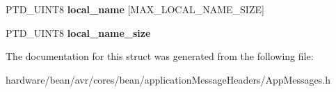 \begin{DoxyCompactItemize}
\item 
\hypertarget{struct_b_t___r_a_d_i_o_c_o_n_f_i_g___t_a07432b46b98c8f527882134e6a9c6299}{}P\+T\+D\+\_\+\+U\+I\+N\+T8 {\bfseries local\+\_\+name} \mbox{[}M\+A\+X\+\_\+\+L\+O\+C\+A\+L\+\_\+\+N\+A\+M\+E\+\_\+\+S\+I\+Z\+E\mbox{]}\label{struct_b_t___r_a_d_i_o_c_o_n_f_i_g___t_a07432b46b98c8f527882134e6a9c6299}

\item 
\hypertarget{struct_b_t___r_a_d_i_o_c_o_n_f_i_g___t_a1028444b2f941f543f3e63f2f1b7d531}{}P\+T\+D\+\_\+\+U\+I\+N\+T8 {\bfseries local\+\_\+name\+\_\+size}\label{struct_b_t___r_a_d_i_o_c_o_n_f_i_g___t_a1028444b2f941f543f3e63f2f1b7d531}

\end{DoxyCompactItemize}


The documentation for this struct was generated from the following file\+:\begin{DoxyCompactItemize}
\item 
hardware/bean/avr/cores/bean/application\+Message\+Headers/App\+Messages.\+h\end{DoxyCompactItemize}
